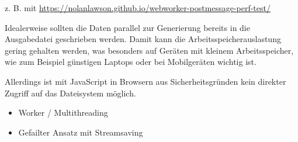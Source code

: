 z. B. mit \url{https://nolanlawson.github.io/webworker-postmessage-perf-test/}


Idealerweise sollten die Daten parallel zur Generierung bereits in die Ausgabedatei geschrieben werden. Damit kann die Arbeitsspeicherauslastung gering gehalten werden, was besonders auf Geräten mit kleinem Arbeitsspeicher, wie zum Beispiel günstigen Laptops oder bei Mobilgeräten wichtig ist.

Allerdings ist mit JavaScript in Browsern aus Sicherheitsgründen kein direkter Zugriff auf das Dateisystem möglich. 

\begin{itemize}
    \item Worker / Multithreading
    \item Gefailter Ansatz mit Streamsaving
\end{itemize}